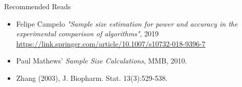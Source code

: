 \begin{frame}{Recommended Reads}
  \begin{itemize}
    \item Felipe Campelo \emph{"Sample size estimation for power and accuracy in the experimental comparison of algorithms"}, 2019
    \url{https://link.springer.com/article/10.1007/s10732-018-9396-7}
    \item Paul Mathews' \textit{Sample Size Calculations}, MMB, 2010.
    \item Zhang (2003), J. Biopharm. Stat. 13(3):529-538.
  \end{itemize}
\end{frame}
